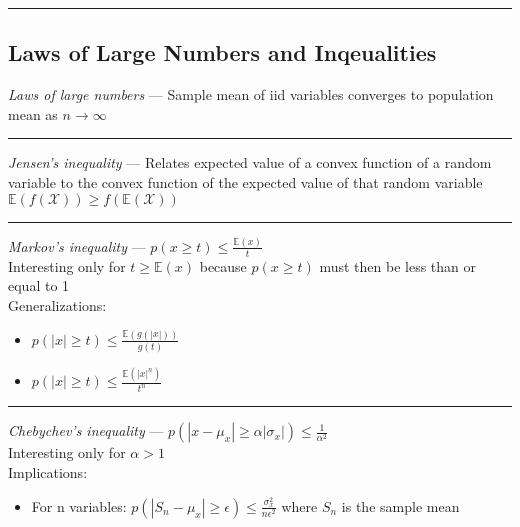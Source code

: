 {\color{black}\hrule height 0.001mm}

\subsection*{Laws of Large Numbers and Inqeualities}
\emph{Laws of large numbers} --- Sample mean of iid variables converges to population mean as $n \rightarrow \infty$

{\color{lightgray}\hrule height 0.001mm}

\emph{Jensen's inequality} --- Relates expected value of a convex function of a random variable to the convex function of the expected value of that random variable\\
$\mathbb{E}(f(\mathcal{X})) \geq f(\mathbb{E}(\mathcal{X}))$

{\color{lightgray}\hrule height 0.001mm}

\emph{Markov's inequality} --- $p(x \geq t) \leq \frac{\mathbb{E}(x)}{t}$\\
Interesting only for $t \geq \mathbb{E}(x)$ because $p(x \geq t)$ must then be less than or equal to 1\\
Generalizations:
\begin{itemize}
    \item $p(|x| \geq t) \leq \frac{\mathbb{E}(g(|x|))}{g(t)}$
    \item $p(|x| \geq t) \leq \frac{\mathbb{E}(|x|^n)}{t^n}$
\end{itemize}

{\color{lightgray}\hrule height 0.001mm}

\emph{Chebychev's inequality} --- $p( |x - \mu_x| \geq \alpha | \sigma_x |) \leq \frac{1}{\alpha^2}$\\
Interesting only for $\alpha > 1$\\
Implications:
\begin{itemize}
    \item For n variables: $p( |S_n - \mu_x| \geq \epsilon) \leq \frac{\sigma_x^2}{n \epsilon^2}$ where $S_n$ is the sample mean
\end{itemize}